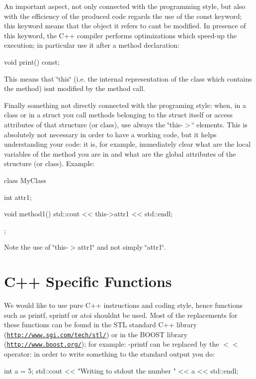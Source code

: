 An important aspect, not only connected with the programming style, but also with the efficiency of the produced code regards the use of the {\ttfamily const} keyword; this keyword means that the object it refers to can\textquotesingle{}t be modified. In presence of this keyword, the C++ compiler performs optimizations which speed-\/up the execution; in particular use it after a method declaration\+: \begin{DoxyVerb}void print() const;
\end{DoxyVerb}
 This means that \char`\"{}this\char`\"{} (i.\+e. the internal representation of the class which contains the method) isn\textquotesingle{}t modified by the method call.

Finally something not directly connected with the programing style\+: when, in a class or in a struct you call methods belonging to the struct itself or access attributes of that structure (or class), use always the \char`\"{}this-\/$>$\char`\"{} elements. This is absolutely not necessary in order to have a working code, but it helps understanding your code\+: it is, for example, immediately clear what are the local variables of the method you are in and what are the global attributes of the structure (or class). Example\+: \begin{DoxyVerb}class MyClass
{
   int attr1;

   void method1()
   {
      std::cout << this->attr1 << std::endl;
   }
};
\end{DoxyVerb}
 Note the use of \char`\"{}this-\/$>$attr1\char`\"{} and not simply \char`\"{}attr1\char`\"{}.\hypertarget{programming_style_special_function}{}\section{C++ Specific Functions}\label{programming_style_special_function}
We would like to use pure C++ instructions and coding style, hence functions such as {\ttfamily printf}, {\ttfamily sprintf} or {\ttfamily atoi} shouldn\textquotesingle{}t be used. Most of the replacements for these functions can be found in the S\+TL standard C++ library (\href{http://www.sgi.com/tech/stl/}{\tt http\+://www.\+sgi.\+com/tech/stl/}) or in the B\+O\+O\+ST library (\href{http://www.boost.org/}{\tt http\+://www.\+boost.\+org/}); for example\+: -\/{\ttfamily printf} can be replaced by the {\ttfamily $<$$<$} operator\+: in order to write something to the standard output you do\+: \begin{DoxyVerb}int a = 5;
std::cout << "Writing to stdout the number " << a << std::endl;
\end{DoxyVerb}

